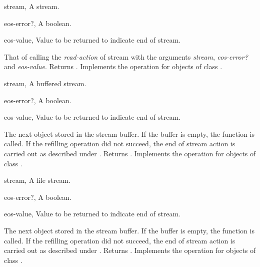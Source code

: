 \begin{optDefinition}
\begin{specargs}
    \item[stream, \classref{stream}] A stream.
    \item[eos-error?, \classref{object}] A boolean.
    \item[eos-value, \classref{object}] Value to be returned to indicate end of
    stream.
\end{specargs}
%
\result%
That of calling the {\em read-action\/} of stream with the arguments {\em
    stream\/}, {\em eos-error?\/} and {\em eos-value}.  Returns \true.
%
\remarks%
Implements the  operation for objects of class
.

\begin{specargs}
    \item[stream, \classref{buffered-stream}] A buffered stream.
    \item[eos-error?, \classref{object}] A boolean.
    \item[eos-value, \classref{object}] Value to be returned to indicate end of
    stream.
\end{specargs}
%
\result%
The next object stored in the stream buffer.  If the buffer is empty,
the function  is called. If the refilling operation did
not succeed, the end of stream action is carried out as described under
.  Returns \true.
%
\remarks%
Implements the  operation for objects of class
.

\begin{specargs}
    \item[stream, \classref{file-stream}] A file stream.
    \item[eos-error?, \classref{object}] A boolean.
    \item[eos-value, \classref{object}] Value to be returned to indicate end of
    stream.
\end{specargs}
%
\result%
The next object stored in the stream buffer.  If the buffer is empty,
the function  is called. If the refilling operation did
not succeed, the end of stream action is carried out as described under
.  Returns \true.
%
\remarks%
Implements the  operation for objects of class
.


\end{optDefinition}

